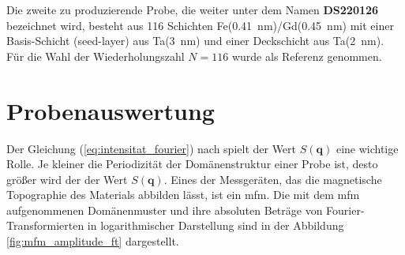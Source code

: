 \noindent
Die zweite zu produzierende Probe, die weiter unter dem Namen \textbf{DS220126} bezeichnet wird, besteht aus 116 Schichten Fe(\SI{0.41}{\nano\meter})/Gd(\SI{0.45}{\nano\meter}) mit einer Basis-Schicht (seed-layer) aus
Ta(\SI{3}{\nano\meter}) und einer Deckschicht aus Ta(\SI{2}{\nano\meter}). Für die Wahl der Wiederholungszahl $N=116$ wurde \cite[Abschnitt „Sample Preparation“]{tripathi_dichroic_2011} als Referenz genommen.

\section{Probenauswertung}
Der Gleichung (\ref{eq:intensitat_fourier}) nach spielt der Wert $S(\mathbf{q})$ eine wichtige Rolle. Je kleiner die Periodizität der Domänenstruktur einer Probe ist, desto größer wird der der Wert $S(\mathbf{q})$. Eines der Messgeräten, das die magnetische Topographie des Materials abbilden lässt, ist ein \gls{mfm}. Die mit dem \gls{mfm} aufgenommenen Domänenmuster und ihre absoluten Beträge von Fourier-Transformierten in logarithmischer Darstellung sind in der Abbildung \ref{fig:mfm_amplitude_ft} dargestellt.

